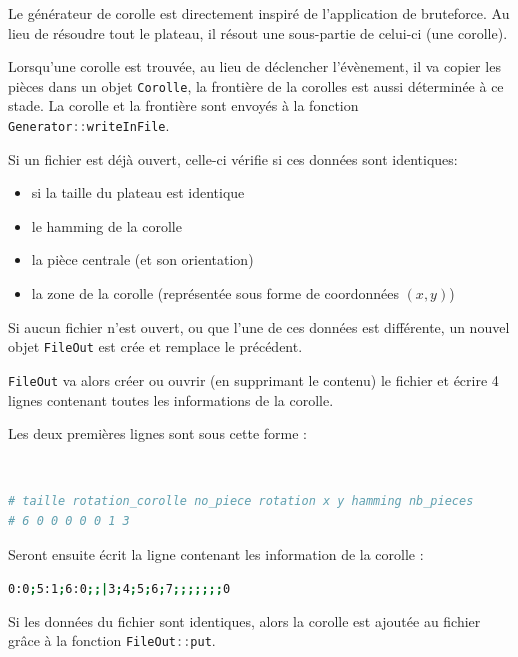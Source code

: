 Le générateur de corolle est directement inspiré de l'application de bruteforce. Au lieu de résoudre tout le plateau, il résout une sous-partie de celui-ci (une corolle).

Lorsqu'une corolle est trouvée, au lieu de déclencher l'évènement, il va copier les pièces dans un objet \lstinline[language=c++]|Corolle|, la frontière de la corolles est aussi déterminée à ce stade. La corolle et la frontière sont envoyés à la fonction \lstinline[language=c++]|Generator::writeInFile|.

Si un fichier est déjà ouvert, celle-ci vérifie si ces données sont identiques:

\begin{itemize}
	\item si la taille du plateau est identique
	\item le hamming de la corolle
	\item la pièce centrale (et son orientation) 
	\item la zone de la corolle (représentée sous forme de coordonnées $(x,y)$)
\end{itemize}
	
	Si aucun fichier n'est ouvert, ou que l'une de ces données est différente, un nouvel objet \lstinline[language=c++]|FileOut| est crée et remplace le précédent.
	
	\lstinline[language=c++]|FileOut| va alors créer ou ouvrir (en supprimant le contenu) le fichier et écrire 4 lignes contenant toutes les informations de la corolle. 
	
	Les deux premières lignes sont sous cette forme :
	
	\begin{exmp}\ 
		
		\begin{lstlisting}[language=bash]
# taille rotation_corolle no_piece rotation x y hamming nb_pieces
# 6 0 0 0 0 0 1 3
	\end{lstlisting}
	\end{exmp}
	
	Seront ensuite écrit la ligne contenant les information de la corolle :
	
	\begin{exmp}
		\lstinline[language=bash]{0:0;5:1;6:0;;|3;4;5;6;7;;;;;;;0}
	\end{exmp}
	
	Si les données du fichier sont identiques, alors la corolle est ajoutée au fichier grâce à la fonction \lstinline[language=c++]{FileOut::put}.
	
